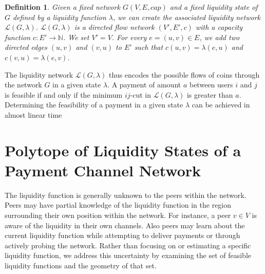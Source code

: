 \documentclass[10pt,twocolumn]{article}
\newtheorem{definition}{Definition}[section]
\begin{document}
\begin{definition}
Given a fixed network \(G(V,E,cap)\) and a fixed liquidity state of \(G\) defined by a liquidity function \(\lambda\), we can create the associated liquidity network \(\mathcal{L}(G,\lambda)\).
\(\mathcal{L}(G,\lambda)\) is a directed flow network \((V',E',c)\) with a capacity function \(c: E' \longrightarrow \mathbb{N}\).
We set \(V' = V\).
For every \(e = (u,v) \in E\), we add two directed edges \((u,v)\) and \((v,u)\) to \(E'\) such that \(c(u,v) = \lambda(e,u)\) and \(c(v,u) = \lambda(e,v)\).
\end{definition}

The liquidity network \(\mathcal{L}(G,\lambda)\) thus encodes the possible flows of coins through the network \(G\) in a given state \(\lambda\).
A payment of amount \(a\) between users \(i\) and \(j\) is feasible if and only if the minimum \(ij\)-cut in \(\mathcal{L}(G,\lambda)\) is greater than \(a\).
Determining the feasibility of a payment in a given state \(\lambda\) can be achieved in almost linear time \cite{chen2022maximum,chen2023almost,van2023deterministic}


\section{Polytope of Liquidity States of a Payment Channel Network}
\label{sec:statePolytope}

The liquidity function is generally unknown to the peers within the network.
Peers may have partial knowledge of the liquidity function in the region surrounding their own position within the network.
For instance, a peer \(v \in V\) is aware of the liquidity in their own channels.
Also peers may learn about the current liquidity function while attempting to deliver payments or through actively probing the network\cite{tikhomirov2020probing}.
Rather than focusing on or estimating a specific liquidity function, we address this uncertainty by examining the set of feasible liquidity functions and the geometry of that set.
\end{document}
